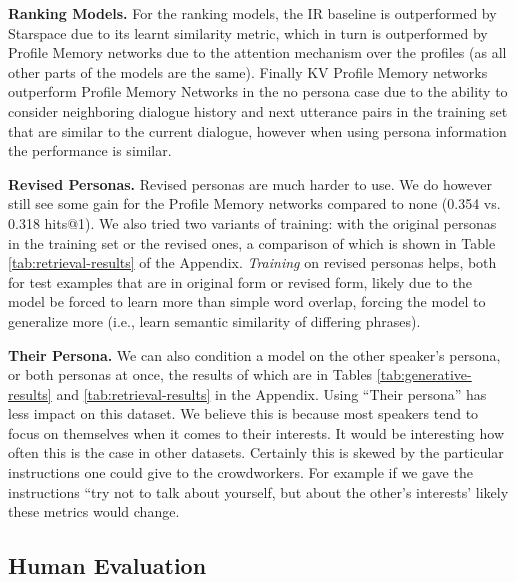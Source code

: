 {\bf Ranking Models.} For the ranking models, the IR baseline is outperformed by Starspace due to its learnt similarity metric, which in turn is outperformed by Profile Memory networks due to the attention mechanism over the profiles (as all other parts of the models are the same). Finally KV Profile Memory networks outperform Profile Memory Networks in the no persona case due to the ability to consider neighboring dialogue history and next utterance pairs in the training set that are similar to the current dialogue, however when using persona information the performance is similar. 


{\bf Revised Personas.} Revised personas are much harder to use. We do however still see some gain for the Profile Memory networks compared to none (0.354 vs. 0.318 hits@1). 
We also tried two variants of training: with the original personas in the training set or the revised ones, a comparison of which is shown in Table \ref{tab:retrieval-results} of the Appendix.  %
{\em Training} on revised personas helps, both for test examples that are in original form or revised form, likely due to the model be forced to learn more than simple word overlap, forcing the model to generalize more (i.e., learn semantic similarity of differing phrases).

{\bf Their Persona.} We can also condition a model on the other speaker's persona, or both personas
at once, the results of which are in Tables \ref{tab:generative-results}
and \ref{tab:retrieval-results} in the Appendix.
Using ``Their persona'' has less impact on this dataset. We believe this is because most speakers tend to focus on themselves when it comes to their interests. It would be interesting how often this is the case in other datasets. Certainly this is skewed by the particular instructions one could give to the crowdworkers. For example if we gave the instructions ``try not to talk about yourself, but about the other's interests' likely these metrics would change.







\subsection{Human Evaluation} \label{sec:human-eval}

